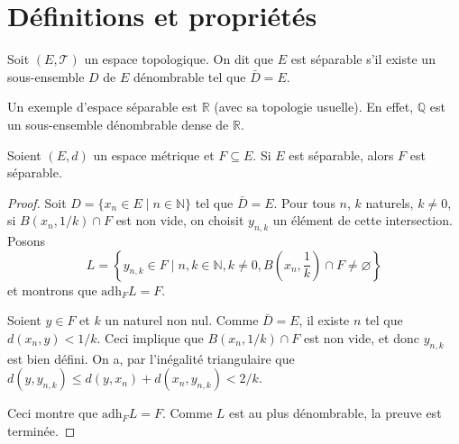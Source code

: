 \section{Définitions et propriétés}
\begin{df}
  Soit $(E, \mathcal T)$ un espace topologique. On dit que $E$ est séparable
  s'il existe un sous-ensemble $D$ de $E$ dénombrable tel que
  $\bar D = E$.
\end{df}

Un exemple d'espace séparable est $\mathbb R$ (avec sa topologie usuelle).
En effet, $\mathbb Q$ est un sous-ensemble dénombrable dense de $\mathbb R$.

\begin{prop}\label{sep:ind}
  Soient $(E, d)$ un espace métrique et $F\subseteq E$. Si $E$ est séparable,
  alors $F$ est séparable.
\end{prop}
\begin{proof}
  Soit $D = \{x_n \in E\mid {n\in\mathbb N}\}$ tel que $\bar D = E$.
  Pour tous $n$, $k$ naturels, $k\neq 0$, si
  $B\left(x_n, 1/k\right)\cap F$ est non
  vide, on choisit $y_{n, k}$ un élément de cette intersection. Posons
  $$L = \left\{y_{n, k} \in F\mid n, k\in\mathbb N, k \neq 0,
    B\left(x_n, \frac{1}{k}\right)\cap F\neq \varnothing\right\}$$
  et montrons que $\mathrm{adh}_F L = F$.

  Soient $y\in F$ et $k$ un naturel non nul.
  Comme $\bar D = E$, il existe $n$ tel que $d(x_n, y) < 1/k$. Ceci implique
  que $B(x_n, 1/k)\cap F$ est non vide, et donc  $y_{n, k}$ est bien défini.
  On a, par l'inégalité triangulaire que $d(y, y_{n, k}) \leq d(y, x_n) +
  d(x_n, y_{n, k}) < 2/k$.

  Ceci montre que $\mathrm{adh}_F L = F$. Comme $L$ est au plus dénombrable,
  la preuve est terminée.
\end{proof}

